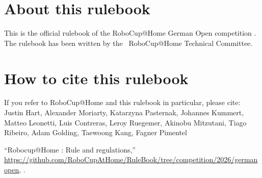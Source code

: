 
\section*{About this rulebook}
This is the official rulebook of the RoboCup@Home German Open competition \YEAR.
The rulebook has been written by the \YEAR ~RoboCup@Home Technical Committee.

\section*{How to cite this rulebook}
If you refer to RoboCup@Home and this rulebook in particular, please cite:\\

\noindent Justin Hart, Alexander Moriarty, Katarzyna Pasternak, Johannes Kummert, Matteo Leonetti, Luis Contreras,
Leroy Ruegemer, Akinobu Mitzutani, Tiago Ribeiro, Adam Golding, Taewoong Kang, Fagner Pimentel

\enquote{Robocup@Home \YEAR: Rule and regulations,}
\url{https://github.com/RoboCupAtHome/RuleBook/tree/competition/2026/germanopen}, \YEAR.

\begin{center}
	\begin{minipage}{0.8\textwidth}
		\footnotesize%
		
	\end{minipage}
\end{center}

\pagebreak